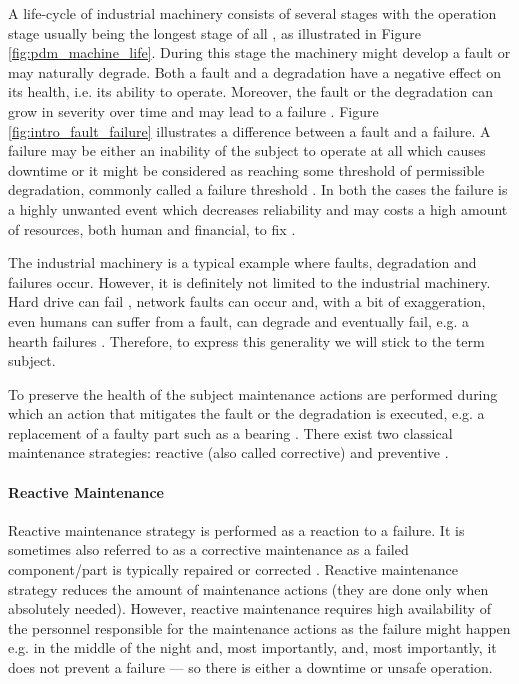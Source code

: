 A life-cycle of industrial machinery consists of several stages with the operation stage usually being the longest stage of all \cite{bilosova2012vibration}, as illustrated in Figure \ref{fig:pdm_machine_life}.
During this stage the machinery might develop a fault or may naturally degrade.
Both a fault and a degradation have a negative effect on its health, i.e. its ability to operate.
Moreover, the fault or the degradation can grow in severity over time and may lead to a failure \cite{lei2018machinery, wind_turbine_failure}.
Figure \ref{fig:intro_fault_failure} illustrates a difference between a fault and a failure.
A failure may be either an inability of the subject to operate at all which causes downtime or it might be considered as reaching some threshold of permissible degradation, commonly called a failure threshold \cite{lei2018machinery}.
In both the cases the failure is a highly unwanted event which decreases reliability and may costs a high amount of resources, both human and financial, to fix \cite{mobley2002introduction}.

The industrial machinery is a typical example where faults, degradation and failures occur.
However, it is definitely not limited to the industrial machinery.
Hard drive can fail \cite{murray2005machine}, network faults can occur \cite{feather1993fault} and, with a bit of exaggeration, even humans can suffer from a fault, can degrade and eventually fail, e.g. a hearth failures \cite{choi2017using, ng2016early}.
Therefore, to express this generality we will stick to the term subject.

To preserve the health of the subject maintenance actions are performed during which an action that mitigates the fault or the degradation is executed, e.g. a replacement of a faulty part such as a bearing \cite{mobley2002introduction}.
There exist two classical maintenance strategies: reactive (also called corrective) and preventive \cite{ran2019survey}.

\paragraph{Reactive Maintenance}
Reactive maintenance strategy is performed as a reaction to a failure.
It is sometimes also referred to as a corrective maintenance as a failed component/part is typically repaired or corrected \cite{ran2019survey}.
Reactive maintenance strategy reduces the amount of maintenance actions (they are done only when absolutely needed).
However, reactive maintenance requires high availability of the personnel responsible for the maintenance actions as the failure might happen e.g. in the middle of the night and, most importantly, and, most importantly, it does not prevent a failure --- so there is either a downtime or unsafe operation.

